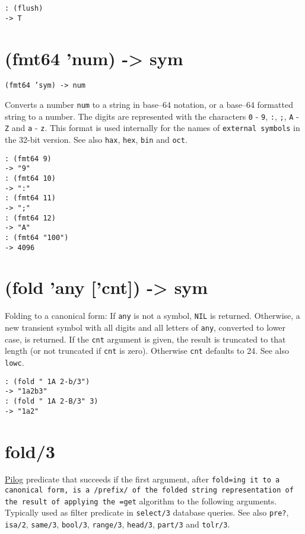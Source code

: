 {{{{{{\begin{verbatim}
: (flush)
-> T
\end{verbatim}

 
\section{(fmt64 'num) -> sym}
\label{sec-8-1-6-17}


\texttt{(fmt64 'sym) -> num}

Converts a number \texttt{num} to a string in base--64 notation, or a base--64
formatted string to a number. The digits are represented with the
characters \texttt{0} - \texttt{9}, \texttt{:}, \texttt{;}, \texttt{A} - \texttt{Z} and \texttt{a} - \texttt{z}. This format is
used internally for the names of \texttt{external symbols} in the 32-bit
version. See also \texttt{hax}, \texttt{hex}, \texttt{bin} and \texttt{oct}.


\begin{verbatim}
: (fmt64 9)
-> "9"
: (fmt64 10)
-> ":"
: (fmt64 11)
-> ";"
: (fmt64 12)
-> "A"
: (fmt64 "100")
-> 4096
\end{verbatim}

 
\section{(fold 'any ['cnt]) -> sym}
\label{sec-8-1-6-18}


Folding to a canonical form: If \texttt{any} is not a symbol, \texttt{NIL} is
returned. Otherwise, a new transient symbol with all digits and all
letters of \texttt{any}, converted to lower case, is returned. If the \texttt{cnt}
argument is given, the result is truncated to that length (or not
truncated if \texttt{cnt} is zero). Otherwise \texttt{cnt} defaults to 24. See also
\texttt{lowc}.


\begin{verbatim}
: (fold " 1A 2-b/3")
-> "1a2b3"
: (fold " 1A 2-B/3" 3)
-> "1a2"
\end{verbatim}

 
\section{fold/3}
\label{sec-8-1-6-19}


\hyperref[ref.html-pilog]{Pilog} predicate that succeeds if the first argument,
after \texttt{fold=ing it to a canonical form, is a /prefix/ of the folded string representation of the result of applying the =get} algorithm to
the following arguments. Typically used as filter predicate in
\texttt{select/3} database queries. See also \texttt{pre?}, \texttt{isa/2}, \texttt{same/3},
\texttt{bool/3}, \texttt{range/3}, \texttt{head/3}, \texttt{part/3} and \texttt{tolr/3}.


}}}}}}
